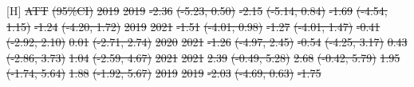 \documentclass[
  letterpaper,
  DIV=11,
  numbers=noendperiod]{scrartcl}
\makeatletter
\renewenvironment{table}%
   {\renewcommand\familydefault\sfdefault
    \@float{table}}
   {\end@float}
\providecommand{\DIFdel}[1]{{\protect\color{red}\sout{#1}}}                      %
\providecommand{\DIFdelFL}[1]{\DIFdel{#1}} %
\makeatother
\begin{document}
\begin{table}[H]
\DIFdelFL{ATT }%
\DIFdelFL{(95\%CI)}%
\DIFdelFL{\hspace{1em}2019 }%
\DIFdelFL{2019 }%
\DIFdelFL{-2.36 }%
\DIFdelFL{(-5.23, 0.50) }%
\DIFdelFL{-2.15 }%
\DIFdelFL{(-5.14, 0.84) }%
\DIFdelFL{-1.69 }%
\DIFdelFL{(-4.54, 1.15) }%
\DIFdelFL{-1.24 }%
\DIFdelFL{(-4.20, 1.72)}%
\DIFdelFL{\hspace{1em}2019 }%
\DIFdelFL{2021 }%
\DIFdelFL{-1.51 }%
\DIFdelFL{(-4.01, 0.98) }%
\DIFdelFL{-1.27 }%
\DIFdelFL{(-4.01, 1.47) }%
\DIFdelFL{-0.41 }%
\DIFdelFL{(-2.92, 2.10) }%
\DIFdelFL{0.01 }%
\DIFdelFL{(-2.71, 2.74)}%
\DIFdelFL{\hspace{1em}2020 }%
\DIFdelFL{2021 }%
\DIFdelFL{-1.26 }%
\DIFdelFL{(-4.97, 2.45) }%
\DIFdelFL{-0.54 }%
\DIFdelFL{(-4.25, 3.17) }%
\DIFdelFL{0.43 }%
\DIFdelFL{(-2.86, 3.73) }%
\DIFdelFL{1.04 }%
\DIFdelFL{(-2.59, 4.67)}%
\DIFdelFL{\hspace{1em}2021 }%
\DIFdelFL{2021 }%
\DIFdelFL{2.39 }%
\DIFdelFL{(-0.49, 5.28) }%
\DIFdelFL{2.68 }%
\DIFdelFL{(-0.42, 5.79) }%
\DIFdelFL{1.95 }%
\DIFdelFL{(-1.74, 5.64) }%
\DIFdelFL{1.88 }%
\DIFdelFL{(-1.92, 5.67)}%
\DIFdelFL{\hspace{1em}2019 }%
\DIFdelFL{2019 }%
\DIFdelFL{-2.03 }%
\DIFdelFL{(-4.69, 0.63) }%
\DIFdelFL{-1.75 }%

\end{table}
\end{document}
